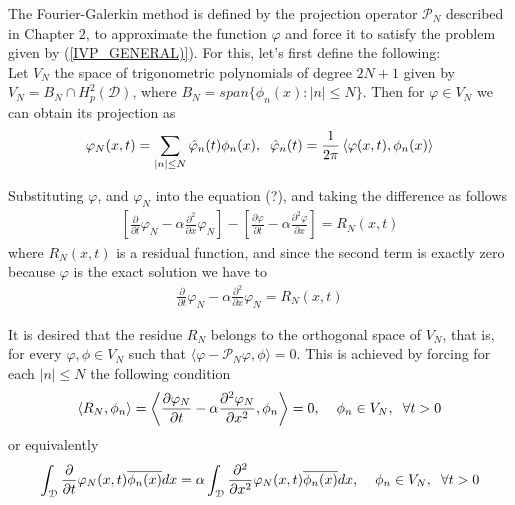 	The Fourier-Galerkin method is defined by the projection operator $\mathcal{P}_N$ described in Chapter $2$, to approximate the function $\varphi$ and force it to satisfy the problem given by (\ref{IVP_GENERAL)}). For this, let's first define the following: \\
	
	Let $V_N$ the space of trigonometric polynomials of degree $2N + 1$ given by $V_N = B_N \cap H^2_p (\mathcal{D})$, where $B_N = span\{\phi_n (x) : |n| \leq N\}$. Then for $\varphi \in V_N$ we can obtain its projection as  
	\begin{align*}
		\varphi_N (x, t) = \displaystyle \sum_{|n| \leq N} \hat{\varphi}_n (t) \phi_n (x), \hspace{2mm} \hat{\varphi}_n (t) = \frac{1}{2 \pi} \left\langle \varphi (x, t), \phi_n (x) \right\rangle  
	\end{align*} 
	
	Substituting $\varphi$, and $\varphi_N$ into the equation (?), and taking the difference as follows
	\begin{align*}
		\left[ \frac{\partial}{\partial t} \varphi_N - \alpha \frac{\partial^2}{\partial x} \varphi_N \right] - \left[ \frac{\partial \varphi}{\partial t} - \alpha \frac{\partial^2 \varphi}{\partial x} \right] = R_N (x, t)   
	\end{align*}
	where $R_N (x, t)$ is a residual function, and since the second term is exactly zero because $\varphi$ is the exact solution we have to
	\begin{align*}
		\frac{\partial}{\partial t} \varphi_N -  \alpha \frac{\partial^2}{\partial x} \varphi_N = R_N (x, t)
	\end{align*}
	
	It is desired that the residue $R_N$ belongs to the orthogonal space of $ V_N $, that is, for every $\varphi, \phi \in V_N $ such that $\langle \varphi - \mathcal{P}_N \varphi, \phi \rangle = 0$. This is achieved by forcing for each $|n| \leq N$ the following condition
	\begin{align}
		\left\langle R_N, \phi_n \right\rangle = \left\langle \frac{\partial \varphi_N}{\partial t} - \alpha \frac{\partial^2 \varphi_N}{\partial x^2}, \phi_n \right\rangle = 0, \hspace{2mm}  \hspace{2mm} \phi_n \in V_N, \hspace{2mm} \forall t > 0
	\end{align}
	or equivalently
	\begin{align*}
		\displaystyle \int_{\mathcal{D}} \frac{\partial}{\partial t} \varphi_N (x, t) \overline{\phi_n (x)} dx = \alpha \int_{\mathcal{D}} \frac{\partial^2}{\partial x^2} \varphi_N (x, t) \overline{\phi_n (x)} dx , \hspace{2mm}  \hspace{2mm} \phi_n \in V_N, \hspace{2mm} \forall t > 0
	\end{align*}
	
